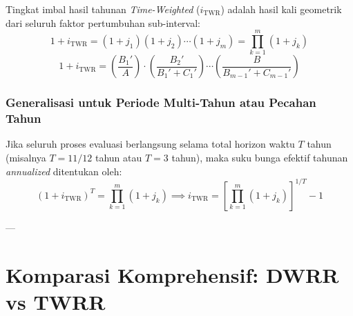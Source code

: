 \documentclass[11pt,a4paper]{article}
\begin{document}
\begin{definitionbox}
Tingkat imbal hasil tahunan \textit{Time-Weighted} ($i_{\text{TWR}}$) adalah hasil kali geometrik dari seluruh faktor pertumbuhan sub-interval:
\begin{equation}
    1 + i_{\text{TWR}} = (1 + j_1)(1 + j_2)\cdots(1 + j_m) = \prod_{k=1}^m (1 + j_k)
\end{equation}
\begin{equation}
    1 + i_{\text{TWR}} = \left( \frac{B_1'}{A} \right) \cdot \left( \frac{B_2'}{B_1' + C_1'} \right) \cdots \left( \frac{B}{B_{m-1}' + C_{m-1}'} \right)
\end{equation}
\end{definitionbox}

\subsubsection{Generalisasi untuk Periode Multi-Tahun atau Pecahan Tahun}
Jika seluruh proses evaluasi berlangsung selama total horizon waktu $T$ tahun (misalnya $T = 11/12$ tahun atau $T = 3$ tahun), maka suku bunga efektif tahunan \textit{annualized} ditentukan oleh:
\begin{equation}
    (1 + i_{\text{TWR}})^T = \prod_{k=1}^m (1 + j_k) \implies i_{\text{TWR}} = \left[ \prod_{k=1}^m (1 + j_k) \right]^{1/T} - 1
\end{equation}

---

\section{Komparasi Komprehensif: DWRR vs TWRR}
\end{document}
